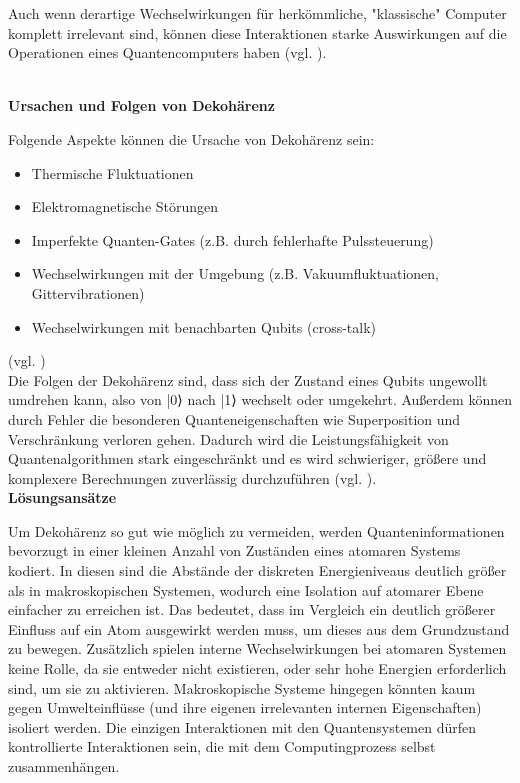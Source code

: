 Auch wenn derartige Wechselwirkungen für herkömmliche, "klassische" Computer komplett irrelevant sind, können diese Interaktionen starke Auswirkungen auf die Operationen eines Quantencomputers haben (vgl. \cite[Ch. 1]{mermin_quantum_2012}).

\\
\textbf{Ursachen und Folgen von Dekohärenz}

Folgende Aspekte können die Ursache von Dekohärenz sein:


\begin{itemize}
    \item Thermische Fluktuationen
    \item Elektromagnetische Störungen
    \item Imperfekte Quanten-Gates (z.B. durch fehlerhafte Pulssteuerung)
    \item Wechselwirkungen mit der Umgebung (z.B. Vakuumfluktuationen, Gittervibrationen)
    \item Wechselwirkungen mit benachbarten Qubits (cross-talk)
\end{itemize}

(vgl. \cite[Ch. 1]{mermin_quantum_2012})
\\

Die Folgen der Dekohärenz sind, dass sich der Zustand eines Qubits ungewollt umdrehen kann, also von |0⟩ nach |1⟩ wechselt oder umgekehrt. Außerdem können durch Fehler die besonderen Quanteneigenschaften wie Superposition und Verschränkung verloren gehen. Dadurch wird die Leistungsfähigkeit von Quantenalgorithmen stark eingeschränkt und es wird schwieriger, größere und komplexere Berechnungen zuverlässig durchzuführen (vgl. \cite[Ch. 7]{nielsen_quantum_2010}).\\



\textbf{Lösungsansätze }

Um Dekohärenz so gut wie möglich zu vermeiden, werden Quanteninformationen bevorzugt in einer kleinen Anzahl von Zuständen eines atomaren Systems kodiert. In diesen sind die Abstände der diskreten Energieniveaus deutlich größer als in makroskopischen Systemen, wodurch eine  Isolation auf atomarer Ebene einfacher zu erreichen ist. Das bedeutet, dass im Vergleich ein deutlich größerer Einfluss auf ein Atom ausgewirkt werden muss, um dieses aus dem Grundzustand zu bewegen. Zusätzlich spielen interne Wechselwirkungen bei atomaren Systemen keine Rolle, da sie entweder nicht existieren, oder sehr hohe Energien erforderlich sind, um sie zu aktivieren.
Makroskopische Systeme hingegen könnten kaum gegen Umwelteinflüsse (und ihre eigenen irrelevanten internen Eigenschaften) isoliert werden. Die einzigen Interaktionen mit den Quantensystemen dürfen kontrollierte Interaktionen sein, die mit dem Computingprozess selbst zusammenhängen. \\

